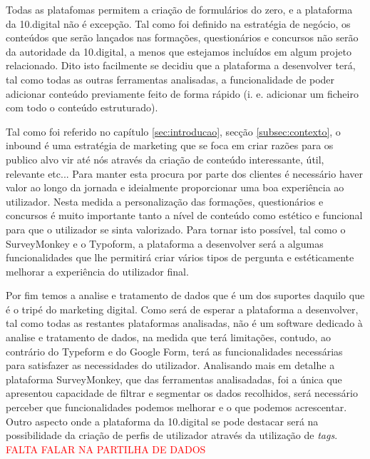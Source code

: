 Todas as platafomas permitem a criação de formulários do zero, e a plataforma da 10.digital não é excepção. Tal como foi definido na estratégia de negócio, os conteúdos que serão lançados nas formações, questionários e concursos não serão da autoridade da 10.digital, a menos que estejamos incluídos em algum projeto relacionado. Dito isto facilmente se decidiu que a plataforma a desenvolver terá, tal como todas as outras ferramentas analisadas, a funcionalidade de poder adicionar conteúdo previamente feito de forma rápido (i. e. adicionar um ficheiro com todo o conteúdo estruturado). 


Tal como foi referido no capítulo \ref{sec:introducao}, secção \ref{subsec:contexto}, o inbound é uma estratégia de marketing que se foca em criar razões para os publico alvo vir até nós através da criação de conteúdo interessante, útil, relevante etc... Para manter esta procura por parte dos clientes é necessário haver valor ao longo da jornada e ideialmente proporcionar uma boa experiência ao utilizador. Nesta medida a personalização das formações, questionários e concursos é muito importante tanto a nível de conteúdo como estético e funcional para que o utilizador se sinta valorizado. Para tornar isto possível, tal como o SurveyMonkey e o Typoform, a plataforma a desenvolver será a algumas funcionalidades que lhe permitirá criar vários tipos de pergunta e estéticamente melhorar a experiência do utilizador final.



Por fim temos a analise e tratamento de dados que é um dos suportes daquilo que é o tripé do marketing digital. Como será de esperar a plataforma a desenvolver, tal como todas as restantes plataformas analisadas, não é um software dedicado à analise e tratamento de dados, na medida que terá limitações, contudo, ao contrário do Typeform e do Google Form, terá as funcionalidades necessárias para satisfazer as necessidades do utilizador. Analisando mais em detalhe a plataforma SurveyMonkey, que das ferramentas analisadadas, foi a única que apresentou capacidade de filtrar e segmentar os dados recolhidos, será necessário perceber que funcionalidades podemos melhorar e o que podemos acrescentar. Outro aspecto onde a plataforma da 10.digital se pode destacar será na possibilidade da criação de perfis de utilizador através da utilização de \textit{tags}. 
\textcolor{red}{ FALTA FALAR NA PARTILHA DE DADOS}

